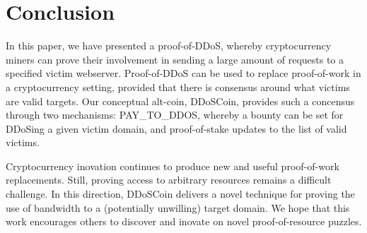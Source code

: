 \section{Conclusion}

In this paper, we have presented a proof-of-DDoS, whereby cryptocurrency miners
can prove their involvement in sending a large amount of requests to a specified
victim webserver. Proof-of-DDoS can be used to replace proof-of-work in a
cryptocurrency setting, provided that there is consensus around what victims are
valid targets. Our conceptual alt-coin, DDoSCoin, provides such a concensus
through two mechanisms: PAY\_TO\_DDOS, whereby a bounty can be set for DDoSing a
given victim domain, and proof-of-stake updates to the list of valid victims.

Cryptocurrency inovation continues to produce new and useful proof-of-work
replacements. Still, proving access to arbitrary resources remains a difficult
challenge. In this direction, DDoSCoin delivers a novel technique for proving
the use of bandwidth to a (potentially unwilling) target domain. We hope that
this work encourages others to discover and inovate on novel proof-of-resource
puzzles.

{\footnotesize\balance

}


